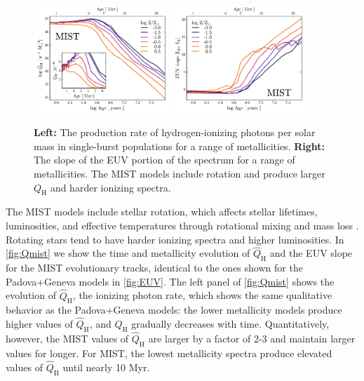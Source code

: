 \documentclass[trackchanges, twocolumn, tighten]{aastex61}
\newcommand{\Fig}[1]{\autoref{fig:#1}}
\newcommand{\QH}{\ensuremath{Q_{\mathrm{H}}}}
\newcommand{\QHat}{\ensuremath{\hat{Q}_{\mathrm{H}}}}
\begin{document}
\begin{figure}
  \begin{centering}
    \includegraphics[width=0.45\textwidth]{f21a.pdf}
    \includegraphics[width=0.45\textwidth]{f21b.pdf}
    \caption{\textbf{Left:} The production rate of hydrogen-ionizing photons per solar mass in single-burst populations for a range of metallicities. \textbf{Right:} The slope of the EUV portion of the spectrum for a range of metallicities. The MIST models include rotation and produce larger \QH{} and harder ionizing spectra.}
    \label{fig:Qmist}
  \end{centering}
\end{figure}

The MIST models include stellar rotation, which affects stellar lifetimes, luminosities, and effective temperatures through rotational mixing and mass loss \citep[][for further details]{Choi16}. Rotating stars tend to have harder ionizing spectra and higher luminosities. In \Fig{Qmist} we show the time and metallicity evolution of \QHat{} and the EUV slope for the MIST evolutionary tracks, identical to the ones shown for the Padova+Geneva models in \Fig{EUV}. The left panel of \Fig{Qmist} shows the evolution of \QHat{}, the ionizing photon rate, which shows the same qualitative behavior as the Padova+Geneva models: the lower metallicity models produce higher values of \QHat{}, and \QHat{} gradually decreases with time. Quantitatively, however, the MIST values of \QHat{} are larger by a factor of 2-3 and maintain larger values for longer. For MIST, the lowest metallicity spectra produce elevated values of \QHat{} until nearly 10 Myr. 
\end{document}
